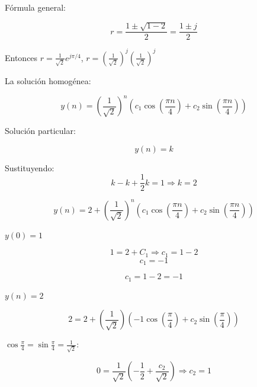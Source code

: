 \documentclass[12pt,a4paper]{article}
\begin{document}
Fórmula general:

\begin{equation}
r = \frac{1 \pm \sqrt{1-2}}{2} = \frac{1 \pm j}{2}
\end{equation}

Entonces $r = \frac{1}{\sqrt{2}} e^{j\pi/4}$, $r = \left(\frac{1}{\sqrt{2}}\right)^j\left(\frac{1}{\sqrt{2}}\right)^j$
\vspace{0.4cm}

La solución homogénea:

\begin{equation}
y(n) = \left(\frac{1}{\sqrt{2}}\right)^n \left(c_1 \cos\left(\frac{\pi n}{4}\right) + c_2 \sin\left(\frac{\pi n}{4}\right)\right)
\end{equation}

Solución particular: 

\begin{equation}
y(n) = k
\end{equation}


Sustituyendo: 
\begin{equation}
k - k + \frac{1}{2} k = 1 \Rightarrow k = 2
\end{equation}


\begin{equation}
y(n) = 2 + \left(\frac{1}{\sqrt{2}}\right)^n \left(c_1 \cos\left(\frac{\pi n}{4}\right) + c_2 \sin\left(\frac{\pi n}{4}\right)\right)
\end{equation}
\vspace{0.4cm}

$y(0) = 1$

\begin{equation}
1 = 2 + C_1 \Rightarrow c_1 = 1 - 2
\end{equation}
\begin{equation}
\boxed{c_1 = -1}
\end{equation}

\begin{equation}
c_1 = 1 - 2 = -1
\end{equation}

$y(n) = 2$

\begin{equation}
2 = 2 + \left(\frac{1}{\sqrt{2}}\right)\left(-1\cos\left(\frac{\pi}{4}\right) + c_2 \sin\left(\frac{\pi}{4}\right)\right)
\end{equation}

$\cos \frac{\pi}{4} = \sin \frac{\pi}{4} = \frac{1}{\sqrt{2}}$:

\begin{equation}
0 = \frac{1}{\sqrt{2}} \left(-\frac{1}{2} + \frac{c_2}{\sqrt{2}}\right) \Rightarrow \boxed{c_2 = 1}
\end{equation}
\end{document}
